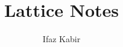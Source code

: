 \documentclass[acmlarge,nonacm,balance=false]{acmart}\settopmatter{printfolios=true,printccs=false,printacmref=false}
\begin{document}
\title[Lattices]{Lattice Notes}         %


\author{Ifaz Kabir}




\maketitle











%


% 
\end{document}
